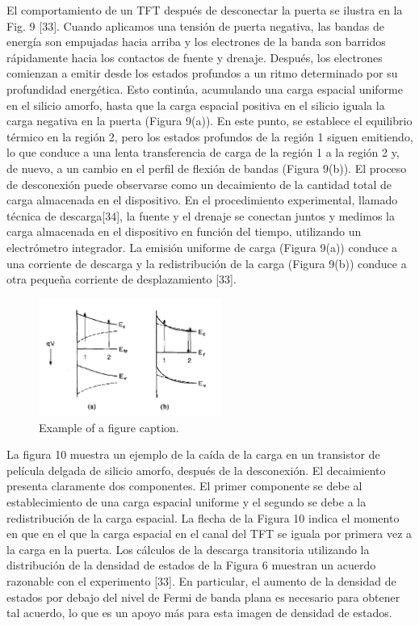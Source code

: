 \documentclass[conference]{IEEEtran}
\begin{document}
    El comportamiento de un TFT después de desconectar la puerta se ilustra en la Fig. 9 [33]. Cuando 
    aplicamos una tensión de puerta negativa, las bandas de energía son empujadas hacia arriba y los 
    electrones de la banda son barridos rápidamente hacia los contactos de fuente y drenaje. Después, 
    los electrones comienzan a emitir desde los estados profundos a un ritmo determinado por su 
    profundidad energética. Esto continúa, acumulando una carga espacial uniforme en el silicio amorfo, 
    hasta que la carga espacial positiva en el silicio iguala la carga negativa en la puerta (Figura 9(a)).
    En este punto, se establece el equilibrio térmico en la región 2, pero los estados profundos de la 
    región 1 siguen emitiendo, lo que conduce a una lenta transferencia de carga de la región 1 a la 
    región 2 y, de nuevo, a un cambio en el perfil de flexión de bandas (Figura 9(b)). El proceso de 
    desconexión puede observarse como un decaimiento de la cantidad total de carga almacenada en el 
    dispositivo. En el procedimiento experimental, llamado técnica de descarga[34], la fuente y el 
    drenaje se conectan juntos y medimos la carga almacenada en el dispositivo en función del tiempo, 
    utilizando un electrómetro integrador. La emisión uniforme de carga (Figura 9(a)) conduce a una 
    corriente de descarga y la redistribución de la carga (Figura 9(b)) conduce a otra pequeña corriente 
    de desplazamiento [33]. 

\begin{figure}[htbp]
    \centerline{\includegraphics[width=6.0cm]{img/imagen-9.png}}
    \caption{Example of a figure caption.}%
    \label{fig9}
\end{figure} 

    La figura 10 muestra un ejemplo de la caída de la carga en un transistor de película delgada de 
    silicio amorfo, después de la desconexión. El decaimiento presenta claramente dos componentes. 
    El primer componente se debe al establecimiento de una carga espacial uniforme y el segundo se 
    debe a la redistribución de la carga espacial. La flecha de la Figura 10 indica el momento en 
    que en el que la carga espacial en el canal del TFT se iguala por primera vez a la carga en la 
    puerta. Los cálculos de la descarga transitoria utilizando la distribución de la densidad de 
    estados de la Figura 6 muestran un acuerdo razonable con el experimento [33]. En particular, el 
    aumento de la densidad de estados por debajo del nivel de Fermi de banda plana es necesario para 
    obtener tal acuerdo, lo que es un apoyo más para esta imagen de densidad de estados.
\end{document}
